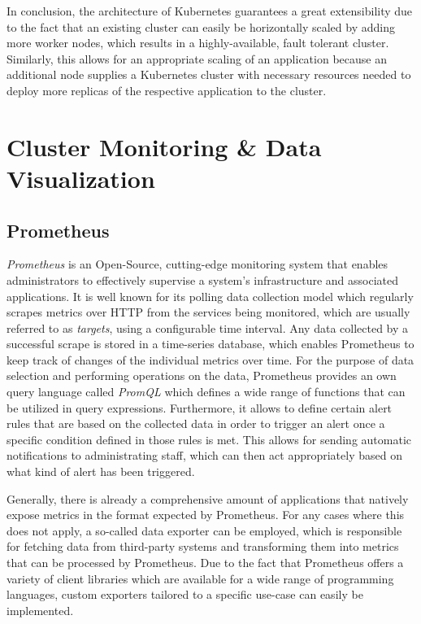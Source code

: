 In conclusion, the architecture of Kubernetes guarantees a great extensibility due to the fact that an existing cluster can easily be horizontally scaled by adding more worker nodes, which results in a highly-available, fault tolerant cluster. Similarly, this allows for an appropriate scaling of an application because an additional node supplies a Kubernetes cluster with necessary resources needed to deploy more replicas of the respective application to the cluster.

\section{Cluster Monitoring \& Data Visualization}
\subsection{Prometheus}
\textit{Prometheus} is an Open-Source, cutting-edge monitoring system that enables administrators to effectively supervise a system's infrastructure and associated applications. It is well known for its polling data collection model which regularly scrapes metrics over HTTP from the services being monitored, which are usually referred to as \textit{targets}, using a configurable time interval. Any data collected by a successful scrape is stored in a time-series database, which enables Prometheus to keep track of changes of the individual metrics over time. For the purpose of data selection and performing operations on the data, Prometheus provides an own query language called \textit{PromQL} which defines a wide range of functions that can be utilized in query expressions. Furthermore, it allows to define certain alert rules that are based on the collected data in order to trigger an alert once a specific condition defined in those rules is met. This allows for sending automatic notifications to administrating staff, which can then act appropriately based on what kind of alert has been triggered.

Generally, there is already a comprehensive amount of applications that natively expose metrics in the format expected by Prometheus. For any cases where this does not apply, a so-called data exporter can be employed, which is responsible for fetching data from third-party systems and transforming them into metrics that can be processed by Prometheus. Due to the fact that Prometheus offers a variety of client libraries which are available for a wide range of programming languages, custom exporters tailored to a specific use-case can easily be implemented.

